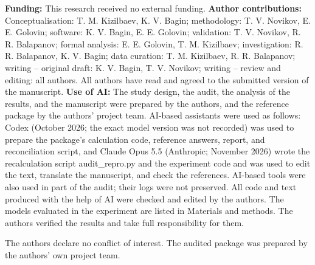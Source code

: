 \documentclass[default]{subfiles}
\begin{document}
{\begin{acknowledgments}
\textbf{Funding:} This research received no external funding. \textbf{Author contributions:} Conceptualisation: T. M. Kizilbaev, K. V. Bagin; methodology: T. V. Novikov, E. E. Golovin; software: K. V. Bagin, E. E. Golovin; validation: T. V. Novikov, R. R. Balapanov; formal analysis: E. E. Golovin, T. M. Kizilbaev; investigation: R. R. Balapanov, K. V. Bagin; data curation: T. M. Kizilbaev, R. R. Balapanov; writing -- original draft: K. V. Bagin, T. V. Novikov; writing -- review and editing: all authors. All authors have read and agreed to the submitted version of the manuscript. \textbf{Use of AI:} The study design, the audit, the analysis of the results, and the manuscript were prepared by the authors, and the reference package by the authors' project team. AI-based assistants were used as follows: Codex (October 2026; the exact model version was not recorded) was used to prepare the package's calculation code, reference answers, report, and reconciliation script, and Claude Opus 5.5 (Anthropic; November 2026) wrote the recalculation script audit\_repro.py and the experiment code and was used to edit the text, translate the manuscript, and check the references. AI-based tools were also used in part of the audit; their logs were not preserved. All code and text produced with the help of AI were checked and edited by the authors. The models evaluated in the experiment are listed in Materials and methods. The authors verified the results and take full responsibility for them.
\end{acknowledgments}

\begin{conflictsofinterest}
The authors declare no conflict of interest. The audited package was prepared by the authors' own project team.
\end{conflictsofinterest}

\putbib[cite]

\makealttitle

} %
\end{document}
